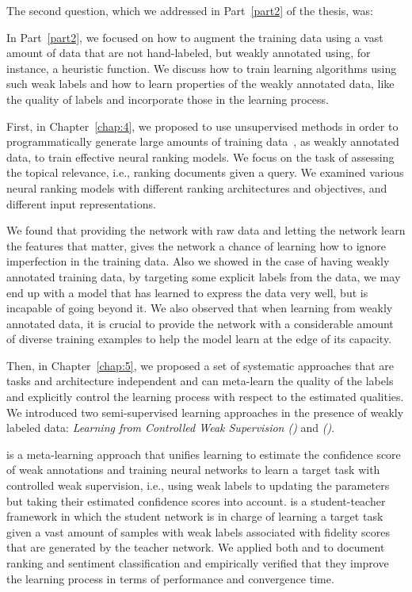 \bigskip
The second question, which we addressed in Part~\ref{part2} of the thesis, was:
%

In Part~\ref{part2}, we focused on how to augment the training data using a vast amount of data that are not hand-labeled, but weakly annotated using, for instance, a heuristic function. We discuss how to train learning algorithms using such weak labels and how to learn properties of the weakly annotated data, like the quality of labels and incorporate those in the learning process.  

First, in Chapter~\ref{chap:4}, we proposed to use unsupervised methods in order to programmatically generate large amounts of training data~\citep{Ratner:2016}, as weakly annotated data, to train effective neural ranking models. We focus on the task of assessing the topical relevance, i.e., ranking documents given a query. We examined various neural ranking models with different ranking architectures and objectives, and different input representations.

We found that providing the network with raw data and letting the network learn the features that matter, gives the network a chance of learning how to ignore imperfection in the training data. Also we showed in the case of having weakly annotated training data, by targeting some explicit labels from the data, we may end up with a model that has learned to express the data very well, but is incapable of going beyond it. We also observed that when learning from weakly annotated data, it is crucial to provide the network with a considerable amount of diverse training examples to help the model learn at the edge of its capacity.

Then, in Chapter~\ref{chap:5}, we proposed a set of systematic approaches that are tasks and architecture independent and can meta-learn the quality of the labels and explicitly control the learning process with respect to the estimated qualities. We introduced two semi-supervised learning approaches in the presence of weakly labeled data: \emph{Learning from Controlled Weak Supervision (\cws)} and \emph{\fwlfulllc (\fwl)}.

\cws is a meta-learning approach that unifies learning to estimate the confidence score of weak annotations and training neural networks to learn a target task with controlled weak supervision, i.e., using weak labels to updating the parameters but taking their estimated confidence scores into account. \fwl is a student-teacher framework in which the student network is in charge of learning a target task given a vast amount of samples with weak labels associated with fidelity scores that are generated by the teacher network.  We applied both \cws and \fwl to document ranking and sentiment classification and empirically verified that they improve the learning process in terms of performance and convergence time. 

